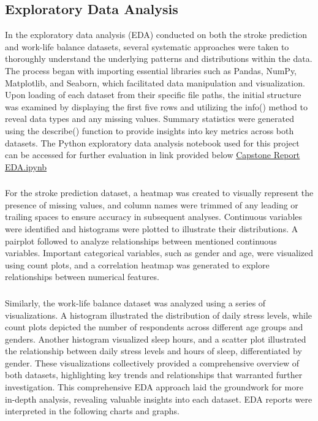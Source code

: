 \documentclass[runningheads]{llncs}
\begin{document}
\begin{enumerate}
\section{Exploratory Data Analysis}
In the exploratory data analysis (EDA) conducted on both the stroke prediction and work-life balance datasets, several systematic approaches were taken to thoroughly understand the underlying patterns and distributions within the data. The process began with importing essential libraries such as Pandas, NumPy, Matplotlib, and Seaborn, which facilitated data manipulation and visualization. Upon loading of each dataset from their specific file paths, the initial structure was examined by displaying the first five rows and utilizing the info() method to reveal data types and any missing values. Summary statistics were generated using the describe() function to provide insights into key metrics across both datasets. The Python exploratory data analysis notebook used for this project can be accessed for further evaluation in link provided below \href{https://github.com/alvaroquintero28/Capstone-Project-Report/blob/main/EDA.ipynb}{Capstone Report EDA.ipynb}

\subsubsection{}
For the stroke prediction dataset, a heatmap was created to visually represent the presence of missing values, and column names were trimmed of any leading or trailing spaces to ensure accuracy in subsequent analyses. Continuous variables were identified and histograms were plotted to illustrate their distributions. A pairplot followed to analyze relationships between mentioned continuous variables. Important categorical variables, such as gender and age, were visualized using count plots, and a correlation heatmap was generated to explore relationships between numerical features. 

\subsubsection{}
Similarly, the work-life balance dataset was analyzed using a series of visualizations. A histogram illustrated the distribution of daily stress levels, while count plots depicted the number of respondents across different age groups and genders. Another histogram visualized sleep hours, and a scatter plot illustrated the relationship between daily stress levels and hours of sleep, differentiated by gender. These visualizations collectively provided a comprehensive overview of both datasets, highlighting key trends and relationships that warranted further investigation. This comprehensive EDA approach laid the groundwork for more in-depth analysis, revealing valuable insights into each dataset.
EDA reports were interpreted in the following charts and graphs.


\end{enumerate}
\end{document}
